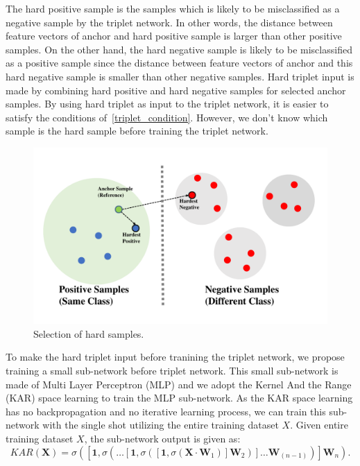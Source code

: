 The hard positive sample is the samples which is likely to be misclassified as a negative sample by the triplet network.
In other words, the distance between feature vectors of anchor and hard positive sample is larger than other positive samples.
On the other hand, the hard negative sample is likely to be misclassified as a positive sample since the distance between feature vectors of anchor and this hard negative sample is smaller than other negative samples.
Hard triplet input is made by combining hard positive and hard negative samples for selected anchor samples. By using hard triplet as input to the triplet network, it is easier to satisfy the conditions of~\ref{triplet_condition}. However, we don't know which sample is the hard sample before training the triplet network.
\begin{figure}[!ht]
    \includegraphics[width=\textwidth]
        {fig_hardsample_v1.pdf}
    \caption{Selection of hard samples.} \label{fig2}
\end{figure}
To make the hard triplet input before tranining the triplet network, we propose training a small sub-network before triplet network.
This small sub-network is made of Multi Layer Perceptron (MLP) and we adopt the Kernel And the Range (KAR) space learning to train the MLP sub-network. As the KAR space learning has no backpropagation and no iterative learning process, we can train this sub-network with the single shot utilizing the entire training dataset $X$. 
Given entire training dataset $X$, the sub-network output is given as: 
\begin{equation}
    KAR\left(\mathbf{X}\right)=\sigma\left(\left[\mathbf{1},\sigma\left(\dots\left[\mathbf{1},\sigma\left(\left[\mathbf{1},\sigma\left(\mathbf{X}\cdot\mathbf{W}_{1}\right)\right]\mathbf{W}_{2}\right)\right]\dots\mathbf{W}_{(n-1)}\right)\right]\mathbf{W}_{n}\right).
\end{equation}
